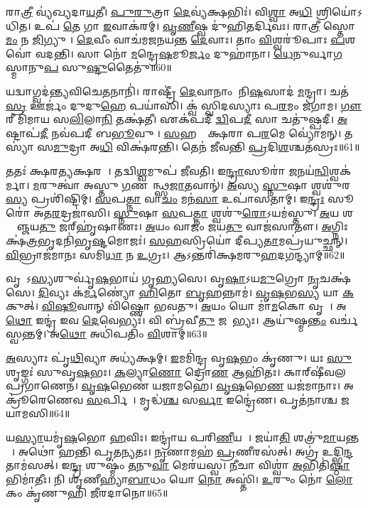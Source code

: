 𑌰𑌾\ul{𑌤𑍍𑌰𑍀} 𑌵𑍍𑌯॑𑌖𑍍𑌯𑌦𑌾\ul{𑌯}𑌤𑍀।
\ul{𑌪𑍁}\ul{𑌰𑍁}𑌤𑍍𑌰𑌾 \ul{𑌦𑍇}𑌵𑍍𑌯॑𑌕𑍍𑌷𑌭𑌿𑌃॑।
𑌵𑌿\ul{𑌶𑍍𑌵𑌾} 𑌅\ul{𑌧𑌿} 𑌶𑍍𑌰𑌿𑌯𑍋॑𑌽𑌧𑌿𑌤।
𑌉𑌪॑ \ul{𑌤𑍇} 𑌗𑌾 \ul{𑌇}𑌵𑌾𑌕॑𑌰𑌮𑍍।
\ul{𑌵𑍃}\ul{𑌣𑍀}𑌷𑍍𑌵 𑌦𑍁॑𑌹𑌿𑌤𑌰𑍍𑌦𑌿𑌵𑌃।
𑌰𑌾\ul{𑌤𑍍𑌰𑍀} 𑌸𑍍𑌤𑍋\ul{𑌮𑌂} 𑌨 \ul{𑌜𑌿}𑌗𑍍𑌯𑍁𑌷𑍀᳚।
\ul{𑌦𑍇}𑌵𑍀𑌂 𑌵𑌾𑌚॑𑌮𑌜𑌨𑌯𑌨𑍍𑌤 \ul{𑌦𑍇}𑌵𑌾𑌃।
𑌤𑌾𑌂 \ul{𑌵𑌿}𑌶𑍍𑌵𑌰𑍂॑𑌪𑌾𑌃 \ul{𑌪}𑌶𑌵𑍋॑ 𑌵𑌦𑌨𑍍𑌤𑌿।
𑌸𑌾 𑌨𑍋॑ \ul{𑌮}𑌨𑍍𑌦𑍍𑌰𑍇\ul{𑌷}𑌮𑍂\ul{𑌰𑍍𑌜𑌂} 𑌦𑍁𑌹𑌾॑𑌨𑌾।
\ul{𑌧𑍇}𑌨𑍁𑌰𑍍𑌵𑌾\ul{𑌗}𑌸𑍍𑌮𑌾𑌨𑍁\ul{𑌪} 𑌸𑍁\ul{𑌷𑍍𑌟𑍁}𑌤𑍈𑌤𑍁॑॥60॥

𑌯𑌦𑍍𑌵𑌾𑌗𑍍𑌵𑌦॑𑌨𑍍𑌤𑍍𑌯𑌵𑌿𑌚𑍇\ul{𑌤}𑌨𑌾𑌨𑌿॑।
𑌰𑌾𑌷𑍍𑌟𑍍𑌰𑍀॑ \ul{𑌦𑍇}𑌵𑌾𑌨𑌾𑌂 𑌨𑌿\ul{𑌷}𑌸𑌾𑌦॑ \ul{𑌮}𑌨𑍍𑌦𑍍𑌰𑌾।
𑌚𑌤॑\ul{𑌸𑍍𑌰} 𑌊𑌰𑍍𑌜𑌂॑ 𑌦𑍁𑌦𑍁\ul{𑌹𑍇} 𑌪𑌯𑌾॑𑌸𑌿।
𑌕𑍍𑌵॑ 𑌸𑍍𑌵𑌿𑌦𑌸𑍍𑌯𑌾𑌃 𑌪\ul{𑌰}𑌮𑌂 𑌜॑𑌗𑌾𑌮।
\ul{𑌗𑍗}𑌰𑍀 𑌮𑌿॑𑌮𑌾𑌯 𑌸\ul{𑌲𑌿}𑌲𑌾\ul{𑌨𑌿} 𑌤𑌕𑍍𑌷॑𑌤𑍀।
𑌏𑌕॑𑌪𑌦𑍀 \ul{𑌦𑍍𑌵𑌿}𑌪\ul{𑌦𑍀} 𑌸𑌾 𑌚𑌤𑍁॑𑌷𑍍𑌪𑌦𑍀।
\ul{𑌅}𑌷𑍍𑌟𑌾𑌪॑\ul{𑌦𑍀} 𑌨𑌵॑𑌪𑌦𑍀 𑌬\ul{𑌭𑍂}𑌵𑍁𑌷𑍀᳚।
\ul{𑌸}𑌹𑌸𑍍𑌰𑌾᳚𑌕𑍍𑌷𑌰𑌾 𑌪\ul{𑌰}𑌮𑍇 𑌵𑍍𑌯𑍋॑𑌮𑌨𑍍।
𑌤𑌸𑍍𑌯𑌾॑ 𑌸\ul{𑌮𑍁}𑌦𑍍𑌰𑌾 𑌅\ul{𑌧𑌿} 𑌵𑌿𑌕𑍍𑌷॑𑌰𑌨𑍍𑌤𑌿।
𑌤𑍇𑌨॑ 𑌜𑍀𑌵𑌨𑍍𑌤𑌿 \ul{𑌪𑍍𑌰}𑌦𑌿\ul{𑌶}𑌶𑍍𑌚𑌤॑𑌸𑍍𑌰𑌃॥61॥

𑌤𑌤𑌃॑ 𑌕𑍍𑌷𑌰\ul{𑌤𑍍𑌯}𑌕𑍍𑌷𑌰𑌮𑍍᳚।
𑌤𑌦𑍍𑌵𑌿\ul{𑌶𑍍𑌵}𑌮𑍁𑌪॑ 𑌜𑍀𑌵𑌤𑌿।
𑌇\ul{𑌨𑍍𑌦𑍍𑌰𑌾}𑌸𑍂𑌰𑌾॑ \ul{𑌜}𑌨𑌯॑\ul{𑌨𑍍𑌵𑌿}𑌶𑍍𑌵𑌕॑𑌰𑍍𑌮𑌾।
\ul{𑌮}𑌰𑍁𑌤𑍍𑌵𑌾॑ 𑌅𑌸𑍍𑌤𑍁 \ul{𑌗}𑌣𑌵𑌾᳚𑌨𑍍𑌥𑍍𑌸\ul{𑌜𑌾}𑌤𑌵𑌾𑌨𑍍॑।
\ul{𑌅}𑌸𑍍𑌯 \ul{𑌸𑍍𑌨𑍁}𑌷𑌾 𑌶𑍍𑌵𑌶𑍁॑𑌰\ul{𑌸𑍍𑌯} 𑌪𑍍𑌰𑌶𑌿॑𑌷𑍍𑌟𑌿𑌮𑍍।
\ul{𑌸}𑌪\ul{𑌤𑍍𑌨𑌾} 𑌵𑌾\ul{𑌚𑌂} 𑌮𑌨॑\ul{𑌸𑌾} 𑌉𑌪𑌾॑𑌸𑌤𑌾𑌮𑍍।
𑌇\ul{𑌨𑍍𑌦𑍍𑌰𑌃} 𑌸𑍂𑌰𑍋॑ 𑌅𑌤\ul{𑌰}𑌦𑍍𑌰𑌜𑌾॑𑌸𑌿।
\ul{𑌸𑍍𑌨𑍁}𑌷𑌾 \ul{𑌸}𑌪\ul{𑌤𑍍𑌨𑌾} 𑌶𑍍𑌵𑌶𑍁॑\ul{𑌰𑍋}\-𑌽𑌯𑌮॑𑌸𑍍𑌤𑍁।
\ul{𑌅}𑌯 𑌶𑌤𑍍𑌰𑍂᳚𑌞𑍍𑌜𑌯\ul{𑌤𑍁} 𑌜𑌰𑍍‌\mbox{}𑌹𑍃॑𑌷𑌾𑌣𑌃।
\ul{𑌅}𑌯𑌂 𑌵𑌾𑌜𑌂॑ 𑌜𑌯\ul{𑌤𑍁} 𑌵𑌾𑌜॑𑌸𑌾𑌤𑍗।
\ul{𑌅}𑌗𑍍𑌨𑌿𑌃 𑌕𑍍𑌷॑\ul{𑌤𑍍𑌰}𑌭𑍃𑌦𑌨𑌿॑𑌭𑍃\ul{𑌷𑍍𑌟}𑌮𑍋𑌜𑌃॑।
\ul{𑌸}\ul{𑌹}𑌸𑍍𑌰𑌿𑌯𑍋॑ 𑌦𑍀𑌪𑍍𑌯\ul{𑌤𑌾}𑌮𑌪𑍍𑌰॑𑌯𑍁𑌚𑍍𑌛𑌨𑍍।
\ul{𑌵𑌿}𑌭𑍍𑌰𑌾𑌜॑𑌮𑌾𑌨𑌃 𑌸𑌮𑌿\ul{𑌧𑌾} 𑌨 \ul{𑌉}𑌗𑍍𑌰𑌃।
𑌆𑌽𑌨𑍍𑌤𑌰𑌿॑𑌕𑍍𑌷𑌮𑌰𑍁\ul{𑌹}𑌦\ul{𑌗}𑌨𑍍𑌦𑍍𑌯𑌾𑌮𑍍॥62॥\anuvakamend[\ul{𑌧𑌾}𑌰𑌯॑𑌨𑍍𑌪𑍁\ul{𑌰𑍋}𑌡𑌾\ul{𑌶𑌂} 𑌬𑍃\ul{𑌹}𑌸𑍍𑌪𑌤𑌿𑌂॑ \ul{𑌜}𑌘𑌨॑𑌚𑍍𑌯𑍁𑌤𑌿𑌮𑌾\ul{𑌨}𑌨𑍍𑌦𑍋 𑌭𑌗॑𑌸𑍍𑌯 𑌤𑍃𑌪𑍍𑌯𑌾\ul{𑌣𑍍𑌯}𑌗𑍍𑌨𑍇𑌃 𑌪𑍃॑\ul{𑌥𑌿}𑌵𑍀 𑌯𑌜𑍍𑌵॑𑌨 𑌏𑌤𑍁 \ul{𑌪𑍍𑌰}𑌦𑌿\ul{𑌶}𑌶𑍍𑌚𑌤॑\ul{𑌸𑍍𑌰𑍋} 𑌵𑌾𑌜॑𑌸𑌾𑌤𑍗 \ul{𑌚}𑌤𑍍𑌵𑌾𑌰𑌿॑ 𑌚]

𑌵𑍃𑌷𑌾᳚\-𑌽\ul{𑌸𑍍𑌯}\ul{}𑌶𑍁𑌰𑍍𑌵𑍃॑\ul{𑌷}𑌭𑌾𑌯॑ 𑌗𑍃𑌹𑍍𑌯𑌸𑍇।
𑌵𑍃\ul{𑌷𑌾}\-𑌽𑌯\ul{𑌮𑍁}𑌗𑍍𑌰𑍋 \ul{𑌨𑍃}𑌚𑌕𑍍𑌷॑𑌸𑍇।
\ul{𑌦𑌿}𑌵𑍍𑌯𑌃 𑌕॑\ul{𑌰𑍍𑌮}𑌣𑍍𑌯𑍋॑ \ul{𑌹𑌿}𑌤𑍋 \ul{𑌬𑍃}𑌹𑌨𑍍𑌨𑌾𑌮॑।
\ul{𑌵𑍃}\ul{𑌷}𑌭\ul{𑌸𑍍𑌯} 𑌯𑌾 \ul{𑌕}𑌕𑍁𑌤𑍍।
\ul{𑌵𑌿}\ul{𑌷𑍂}𑌵𑌾𑌨𑍍 𑌵𑌿॑𑌷𑍍𑌣𑍋 𑌭𑌵𑌤𑍁।
\ul{𑌅}𑌯𑌂 𑌯𑍋 𑌮𑌾॑\ul{𑌮}𑌕𑍋 𑌵𑍃𑌷𑌾᳚।
𑌅\ul{𑌥𑍋} 𑌇𑌨𑍍𑌦𑍍𑌰॑ 𑌇𑌵 \ul{𑌦𑍇}𑌵𑍇𑌭𑍍𑌯𑌃॑।
𑌵𑌿 𑌬𑍍𑌰॑𑌵𑍀\ul{𑌤𑍁} 𑌜𑌨𑍇᳚𑌭𑍍𑌯𑌃।
𑌆𑌯𑍁॑𑌷𑍍𑌮\ul{𑌨𑍍𑌤𑌂} 𑌵𑌰𑍍𑌚॑𑌸𑍍𑌵𑌨𑍍𑌤𑌮𑍍।
𑌅\ul{𑌥𑍋} 𑌅𑌧𑌿॑𑌪𑌤𑌿𑌂 \ul{𑌵𑌿}𑌶𑌾𑌮𑍍॥63॥

\ul{𑌅}𑌸𑍍𑌯𑌾𑌃 𑌪𑍃॑\ul{𑌥𑌿}𑌵𑍍𑌯𑌾 𑌅𑌧𑍍𑌯॑𑌕𑍍𑌷𑌮𑍍।
\ul{𑌇}𑌮𑌮𑌿॑𑌨𑍍𑌦𑍍𑌰 𑌵𑍃\ul{𑌷}𑌭𑌂 𑌕𑍃॑𑌣𑍁।
𑌯𑌃 \ul{𑌸𑍁}𑌶𑍃𑌙𑍍𑌗𑌃॑ 𑌸𑍁𑌵𑍃\ul{𑌷}𑌭𑌃।
\ul{𑌕}𑌲𑍍𑌯𑌾\ul{𑌣𑍋} 𑌦𑍍𑌰𑍋\ul{𑌣} 𑌆𑌹𑌿॑𑌤𑌃।
𑌕𑌾𑌰𑍍‌\mbox{}𑌷𑍀॑𑌵𑌲 𑌪𑍍𑌰𑌗𑌾𑌣𑍇𑌨।
\ul{𑌵𑍃}\ul{𑌷}𑌭𑍇𑌣॑ 𑌯𑌜𑌾𑌮𑌹𑍇।
\ul{𑌵𑍃}\ul{𑌷}𑌭𑍇\ul{𑌣} 𑌯𑌜॑𑌮𑌾𑌨𑌾𑌃।
𑌅𑌕𑍍𑌰𑍂॑𑌰𑍇𑌣𑍇𑌵 \ul{𑌸}𑌰𑍍𑌪𑌿𑌷𑌾᳚।
𑌮𑍃𑌦𑍍𑌧॑\ul{𑌶𑍍𑌚} 𑌸\ul{𑌰𑍍𑌵𑌾} 𑌇𑌨𑍍𑌦𑍍𑌰𑍇॑𑌣।
𑌪𑍃𑌤॑𑌨𑌾𑌶𑍍𑌚 𑌜𑌯𑌾𑌮𑌸𑌿॥64॥

𑌯\ul{𑌸𑍍𑌯𑌾}𑌯𑌮𑍃॑\ul{𑌷}𑌭𑍋 \ul{𑌹}𑌵𑌿𑌃।
𑌇𑌨𑍍𑌦𑍍𑌰𑌾॑𑌯 𑌪𑌰𑌿\ul{𑌣𑍀}𑌯𑌤𑍇᳚।
𑌜𑌯𑌾॑\ul{𑌤𑌿} 𑌶𑌤𑍍𑌰𑍁॑\ul{𑌮𑌾}𑌯𑌨𑍍𑌤𑌮𑍍᳚।
𑌅𑌥𑍋॑ 𑌹𑌨𑍍𑌤𑌿 𑌪𑍃𑌤\ul{𑌨𑍍𑌯}𑌤𑌃।
\ul{𑌨𑍃}𑌣𑌾𑌮𑌹॑ \ul{𑌪𑍍𑌰}𑌣𑍀𑌰𑌸॑𑌤𑍍।
𑌅𑌗𑍍𑌰॑ 𑌉𑌦𑍍𑌭𑌿\ul{𑌨𑍍𑌦}𑌤𑌾𑌮॑𑌸𑌤𑍍।
𑌇\ul{𑌨𑍍𑌦𑍍𑌰} 𑌶𑍁𑌷𑍍𑌮𑌂॑ \ul{𑌤}𑌨𑍁\ul{𑌵𑌾} 𑌮𑍇𑌰॑𑌯𑌸𑍍𑌵।
\ul{𑌨𑍀}𑌚𑌾 𑌵𑌿𑌶𑍍𑌵𑌾॑ \ul{𑌅}𑌭𑌿𑌤𑌿॑\ul{𑌷𑍍𑌠𑌾}𑌭𑌿𑌮𑌾॑𑌤𑍀𑌃।
𑌨𑌿 𑌶𑍃॑𑌣𑍀𑌹𑍍𑌯𑌾\ul{𑌬𑌾}𑌧𑌂 𑌯𑍋 \ul{𑌨𑍋} 𑌅𑌸𑍍𑌤𑌿॑।
\ul{𑌉}𑌰𑍁𑌂 𑌨𑍋॑ \ul{𑌲𑍋}𑌕𑌂 𑌕𑍃॑𑌣𑍁𑌹𑌿 𑌜𑍀𑌰𑌦𑌾𑌨𑍋॥65॥

